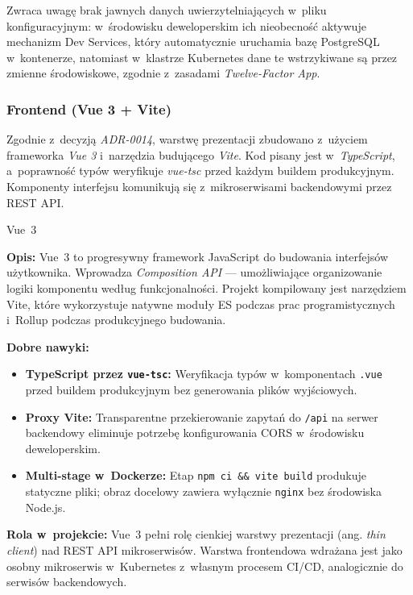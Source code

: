 Zwraca uwagę brak jawnych danych uwierzytelniających w~pliku konfiguracyjnym: w~środowisku deweloperskim ich nieobecność aktywuje mechanizm Dev Services, który automatycznie uruchamia bazę PostgreSQL w~kontenerze, natomiast w~klastrze Kubernetes dane te wstrzykiwane są przez zmienne środowiskowe, zgodnie z~zasadami \textit{Twelve-Factor App}.


\subsubsection{Frontend (Vue 3 + Vite)}
Zgodnie z~decyzją \textit{ADR-0014}, warstwę prezentacji zbudowano z~użyciem frameworka \textit{Vue 3} i~narzędzia budującego \textit{Vite}. Kod pisany jest w~\textit{TypeScript}, a~poprawność typów weryfikuje \textit{vue-tsc} przed każdym buildem produkcyjnym. Komponenty interfejsu komunikują się z~mikroserwisami backendowymi przez REST API.

\begin{techcard}{Vue~3}

\textbf{Opis:} Vue~3 to progresywny framework JavaScript do budowania interfejsów użytkownika. Wprowadza \textit{Composition API} --- umożliwiające organizowanie logiki komponentu według funkcjonalności. Projekt kompilowany jest narzędziem Vite, które wykorzystuje natywne moduły ES podczas prac programistycznych i~Rollup podczas produkcyjnego budowania.

\textbf{Dobre nawyki:}
\begin{itemize}
  \item \textbf{TypeScript przez \texttt{vue-tsc}:} Weryfikacja typów w~komponentach \texttt{.vue} przed buildem produkcyjnym bez generowania plików wyjściowych.
  \item \textbf{Proxy Vite:} Transparentne przekierowanie zapytań do \texttt{/api} na serwer backendowy eliminuje potrzebę konfigurowania CORS w~środowisku deweloperskim.
  \item \textbf{Multi-stage w~Dockerze:} Etap \texttt{npm ci \&\& vite build} produkuje statyczne pliki; obraz docelowy zawiera wyłącznie \texttt{nginx} bez środowiska Node.js.
\end{itemize}

\textbf{Rola w~projekcie:} Vue~3 pełni rolę cienkiej warstwy prezentacji (ang. \textit{thin client}) nad REST API mikroserwisów. Warstwa frontendowa wdrażana jest jako osobny mikroserwis w~Kubernetes z~własnym procesem CI/CD, analogicznie do serwisów backendowych.

\end{techcard}

